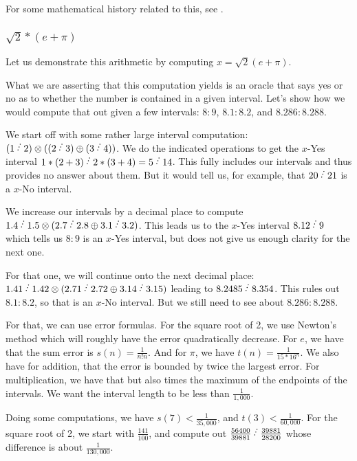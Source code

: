 \documentclass[12pt]{article}
\begin{document}
For some mathematical history related to this, see \cite{fowler}.

\subsubsection{\texorpdfstring{$\sqrt{2}*(e + \pi)$}{2epi}}

Let us demonstrate this arithmetic by computing $x = \sqrt{2}(e + \pi)$. 

What we are asserting that this computation yields is an oracle that says yes or no as to whether the number is contained in a given interval. Let's show how we would compute that out given a few intervals:  $8:9$, $8.1:8.2$, and $8.286:8.288$.

We start off with some rather large interval computation: $(1 \lte 2) \otimes ( (2\lte  3) \oplus (3 \lte 4))$. We do the indicated operations to get the $x$-Yes interval $1*(2+3) \lte 2*(3+4) = 5 \lte 14$. This fully includes our intervals and thus provides no answer about them. But it would tell us, for example, that $20 \lte  21$ is a $x$-No interval. 

We increase our intervals by a decimal place to compute $1.4 \lte  1.5 \otimes ( 2.7\lte 2.8 \oplus 3.1 \lte 3.2)$. This leads us to the $x$-Yes interval $8.12 \lte 9$ which tells us $8:9$ is an $x$-Yes interval, but does not give us enough clarity for the next one. 

For that one, we will continue onto the next decimal place: $1.41 \lte 1.42 \otimes (2.71\lte 2.72 \oplus 3.14 \lte   3.15)$ leading to $8.2485 \lte  8.354$. This rules out $8.1:8.2$, so that is an $x$-No interval. But we still need to see about $8.286:8.288$.

For that, we can use error formulas. For the square root of 2, we use Newton's method which will roughly have the error quadratically decrease.  For $e$, we have that the sum error is $s(n) = \frac{1}{n!n}$. And for $\pi$, we have $t(n) = \frac{1}{15 * 16^n}$. We also have for addition, that the error is bounded by twice the largest error. For multiplication, we have that but also times the maximum of the endpoints of the intervals. We want the interval length to be less than $\frac{1}{1,000}$. 

Doing some computations, we have $s(7) < \frac{1}{35,000}$, and $t(3) < \frac{1}{60,000}$. For the square root of 2, we start with $\frac{141}{100}$, and compute out $\frac{56400}{39881} \lte \frac{39881}{28200}$ whose difference is about $\frac{1}{130,000}$.
\end{document}
